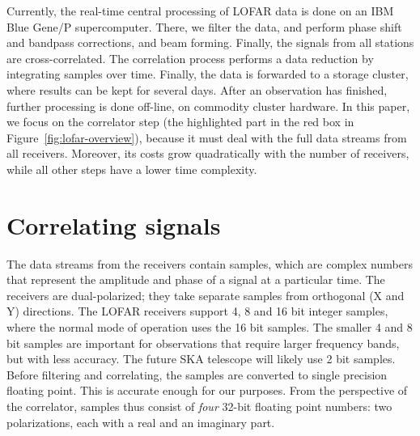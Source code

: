 \documentclass{article}
\begin{document}
Currently, the real-time central processing of LOFAR data is done on
an IBM Blue Gene/P supercomputer.  There, we filter the data, and
perform phase shift and bandpass corrections, and beam forming.
Finally, the signals from all stations are cross-correlated.  The
correlation process performs a data reduction by integrating samples
over time.  Finally, the data is forwarded to a storage cluster, where
results can be kept for several days.  After an observation has
finished, further processing is done off-line, on commodity cluster
hardware.  In this paper, we focus on the correlator step (the
highlighted part in the red box in
Figure~\ref{fig:lofar-overview}), because it must deal with the
full data streams from all receivers. Moreover, its costs grow
quadratically with the number of receivers, while all other steps have
a lower time complexity.


\section{Correlating signals}







The data streams from the receivers contain samples, which are complex
numbers that represent the amplitude and phase of a signal at a
particular time.  The receivers are dual-polarized; they take separate
samples from orthogonal (X and Y) directions.  The LOFAR receivers
support 4, 8 and 16 bit integer samples, where the normal mode of
operation uses the 16 bit samples. The smaller 4 and 8 bit samples are important
for observations that require larger frequency bands, but with less accuracy.
The future SKA telescope will
likely use 2 bit samples.  Before filtering and correlating, the
samples are converted to single precision floating point.  This is
accurate enough for our purposes. From the perspective of the
correlator, samples thus consist of \emph{four} 32-bit floating point
numbers: two polarizations, each with a real and an imaginary part.
\end{document}
